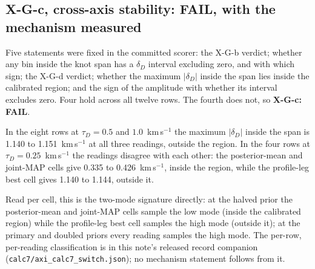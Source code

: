 \documentclass[11pt]{article}
\newcommand{\dD}{\ensuremath{\delta_D}}
\newcommand{\tD}{\ensuremath{\tau_D}}
\begin{document}
\subsection{X-G-c, cross-axis stability: FAIL, with the mechanism measured}
\label{sec:gates-c}

Five statements were fixed in the committed scorer: the X-G-b verdict; whether any bin inside the knot span has a \dD{} interval excluding zero, and with which sign; the X-G-d verdict; whether the maximum $|\dD|$ inside the span lies inside the calibrated region; and the sign of the amplitude with whether its interval excludes zero. Four hold across all twelve rows. The fourth does not, so \textbf{X-G-c: FAIL}.

In the eight rows at $\tD = 0.5$ and $1.0$~km\,s$^{-1}$ the maximum $|\dD|$ inside the span is 1.140 to 1.151~km\,s$^{-1}$ at all three readings, outside the region. In the four rows at $\tD = 0.25$~km\,s$^{-1}$ the readings disagree with each other: the posterior-mean and joint-MAP cells give 0.335 to 0.426~km\,s$^{-1}$, inside the region, while the profile-leg best cell gives 1.140 to 1.144, outside it.

Read per cell, this is the two-mode signature directly: at the halved prior the posterior-mean and joint-MAP cells sample the low mode (inside the calibrated region) while the profile-leg best cell samples the high mode (outside it); at the primary and doubled priors every reading samples the high mode. The per-row, per-reading classification is in this note's released record companion (\texttt{calc7/axi\_calc7\_switch.json}); no mechanism statement follows from it.
\end{document}
